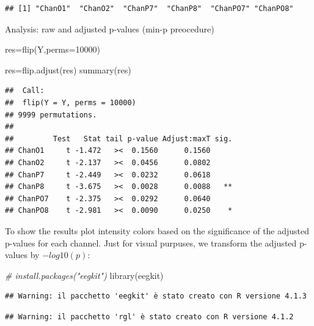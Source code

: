 \documentclass[
]{article}
\newenvironment{Shaded}{\begin{snugshade}}{\end{snugshade}}
\newcommand{\AttributeTok}[1]{\textcolor[rgb]{0.77,0.63,0.00}{#1}}
\newcommand{\CommentTok}[1]{\textcolor[rgb]{0.56,0.35,0.01}{\textit{#1}}}
\newcommand{\DecValTok}[1]{\textcolor[rgb]{0.00,0.00,0.81}{#1}}
\newcommand{\FunctionTok}[1]{\textcolor[rgb]{0.00,0.00,0.00}{#1}}
\newcommand{\NormalTok}[1]{#1}
\newcommand{\OtherTok}[1]{\textcolor[rgb]{0.56,0.35,0.01}{#1}}
\begin{document}
\begin{verbatim}
## [1] "ChanO1"  "ChanO2"  "ChanP7"  "ChanP8"  "ChanPO7" "ChanPO8"
\end{verbatim}

Analysis: raw and adjusted p-values (min-p preocedure)

\begin{Shaded}
\begin{Highlighting}[]
\NormalTok{res}\OtherTok{=}\FunctionTok{flip}\NormalTok{(Y,}\AttributeTok{perms=}\DecValTok{10000}\NormalTok{)}

\NormalTok{res}\OtherTok{=}\FunctionTok{flip.adjust}\NormalTok{(res)}
\FunctionTok{summary}\NormalTok{(res)}
\end{Highlighting}
\end{Shaded}

\begin{verbatim}
##  Call:
##  flip(Y = Y, perms = 10000) 
## 9999 permutations.
## 
##         Test   Stat tail p-value Adjust:maxT sig.
## ChanO1     t -1.472   ><  0.1560      0.1560     
## ChanO2     t -2.137   ><  0.0456      0.0802     
## ChanP7     t -2.449   ><  0.0232      0.0618     
## ChanP8     t -3.675   ><  0.0028      0.0088   **
## ChanPO7    t -2.375   ><  0.0292      0.0640     
## ChanPO8    t -2.981   ><  0.0090      0.0250    *
\end{verbatim}

To show the results plot intensity colors based on the significance of
the adjusted p-values for each channel. Just for visual purpuses, we
transform the adjusted p-values by \(-log10(p)\):

\begin{Shaded}
\begin{Highlighting}[]
\CommentTok{\# install.packages("eegkit")}
\FunctionTok{library}\NormalTok{(eegkit)}
\end{Highlighting}
\end{Shaded}

\begin{verbatim}
## Warning: il pacchetto 'eegkit' è stato creato con R versione 4.1.3
\end{verbatim}

\begin{verbatim}
## Warning: il pacchetto 'rgl' è stato creato con R versione 4.1.2
\end{verbatim}
\end{document}
